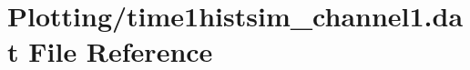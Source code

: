 \hypertarget{Plotting_2time1histsim__channel1_8dat}{}\section{Plotting/time1histsim\+\_\+channel1.dat File Reference}
\label{Plotting_2time1histsim__channel1_8dat}
